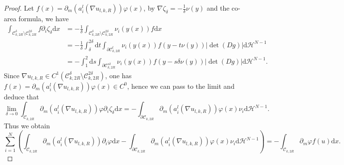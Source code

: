 \documentclass[12pt]{amsart}
\theoremstyle{definition}
\theoremstyle{remark}
\theoremstyle{conclusion}
\theoremstyle{conjecture}
\numberwithin{equation}{section}
\begin{document}
\begin{proof}
Let $f(x)=\partial_m (a^l_i(\nabla u_{l,k,R}))\varphi(x) $, by $\nabla\zeta _{\delta}=-\frac{1}{\delta}\nu(y)$ and the co-area formula, we have
 \begin{equation*}
    \begin{aligned}
        \int_{\mathcal{C}_{k,2R}^{\delta}\setminus \mathcal{C}_{k,2R}^{2\delta}}f\partial_i\zeta_{\delta}\mathrm{d}x
            &=-\frac{1}{\delta} \int_{\mathcal{C}_{k,2R}^{\delta}\setminus \mathcal{C}_{k,2R}^{2\delta}}\nu_i(y(x))f\mathrm{d}x\\
            &=-\frac{1}{\delta}\int_{\delta}^{2\delta}\mathrm{d}t\int_{\partial\mathcal{C}_{k,2R}^{t}}\nu_i(y(x))f(y-t\nu(y))|\det(Dg)|\mathrm{d}\mathcal{H}^{N-1}\\
            &=-\int_{1}^{2}\mathrm{d}s\int_{\partial\mathcal{C}_{k,2R}^{s\delta}}\nu_i(y(x))f(y-s\delta\nu(y))|\det(Dg)|\mathrm{d}\mathcal{H}^{N-1}.
    \end{aligned}
 \end{equation*}
Since $\nabla u_{l,k,R}\in C^1(\mathcal{C}_{k,2R}^{\delta}\setminus\mathcal{C}_{k,2R}^{2\delta})$, one has $f(x)=\partial_m (a^l_i(\nabla u_{l,k,R}))\varphi(x) \in C^{0}$, hence we can pass to the limit and deduce that
\begin{equation*}
    \lim\limits_{\delta\rightarrow0}\int_{\mathcal{C}_{k,2R}}\partial_m (a^l_i(\nabla u_{l,k,R}))\varphi\partial_i\zeta_{\delta} \mathrm{d}x
    =-\int_{\partial\mathcal{C}_{k,2R}}\partial_m (a^l_i(\nabla u_{l,k,R}))\varphi(x)\nu_i \mathrm{d}\mathcal{H}^{N-1}.
\end{equation*}
Thus we obtain
\begin{equation}\label{eq3.10}
    \sum\limits_{i=1}^{N} \left(\int_{\mathcal{C}_{k,2R}}\partial_m (a^l_i(\nabla u_{l,k,R}))\partial_i\varphi \mathrm{d}x
    -\int_{\partial\mathcal{C}_{k,2R}}\partial_m (a^l_i(\nabla u_{l,k,R}))\varphi(x)\nu_i \mathrm{d}\mathcal{H}^{N-1}\right)
     =-\int_{\mathcal{C}_{k,2R}}\partial_m \varphi f(u)\mathrm{d}x.
\end{equation}


\end{proof}
\end{document}
